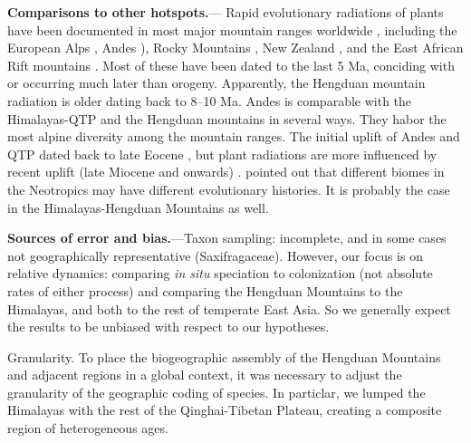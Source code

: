 \textbf{Comparisons to other hotspots.}---%
Rapid evolutionary radiations of plants have been documented in most major mountain ranges worldwide \citep[reviewed in][]{Hughes2015}, including the European Alps \citep{Roquet2013}, Andes \citep[e.g.][]{Hughes2006,Luebert2014}), Rocky Mountains \citep{DrummondC2012}, New Zealand \citep{Joly2014}, and the East African Rift mountains \citep{Linder2014}. Most of these have been dated to the last 5 Ma, conciding with or occurring much later than orogeny. Apparently, the Hengduan mountain radiation is older dating back to 8--10 Ma. Andes is comparable with the Himalayas-QTP and the Hengduan mountains in several ways. They habor the most alpine diversity among the mountain ranges. The initial uplift of Andes and QTP dated back to late Eocene \citep{Gregory-Wodzicki2000,Graham2009}, but plant radiations are more influenced by recent uplift (late Miocene and onwards) \citep{Hughes2013,Luebert2014,Hughes2015,Madrinan2013}. \citet{Hughes2013} pointed out that different biomes in the Neotropics may have different evolutionary histories. It is probably the case in the Himalayas-Hengduan Mountains as well. 

\textbf{Sources of error and bias.}---Taxon sampling: incomplete, and in some cases not geographically representative (Saxifragaceae). However, our focus is on relative dynamics: comparing \textit{in situ} speciation to colonization (not absolute rates of either process) and comparing the Hengduan Mountains to the Himalayas, and both to the rest of temperate East Asia. So we generally expect the results to be unbiased with respect to our hypotheses.

Granularity. To place the biogeographic assembly of the Hengduan Mountains and adjacent regions in a global context, it was necessary to adjust the granularity of the geographic coding of species. In particlar, we lumped the Himalayas with the rest of the Qinghai-Tibetan Plateau, creating a composite region of heterogeneous ages.


